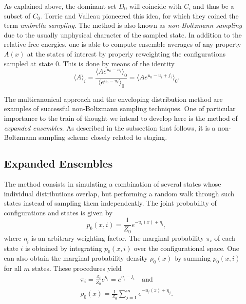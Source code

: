\documentclass[aip,jcp,preprint,amsmath,amssymb]{revtex4-1}
\begin{document}
As explained above, the dominant set $D_0$ will coincide with $C_i$ and thus be a subset of $C_0$. Torrie and Valleau\cite{Torrie_1977} pioneered this idea, for which they coined the term \textit{umbrella sampling}. The method is also known as \textit{non-Boltzmann sampling} due to the usually unphysical character of the sampled state. In addition to the relative free energies, one is able to compute ensemble averages of any property $A(x)$ at the states of interest by properly reweighting the configurations sampled at state $0$. This is done by means of the identity\cite{Torrie_1977}
\begin{equation}
\label{eq:umbrella sampling reweighting}
\langle A \rangle_i = \frac{\langle A e^{u_0 - u_i} \rangle_0}{\langle e^{u_0 - u_i} \rangle_0} = \langle A e^{u_0 - u_i + f_i} \rangle_0.
\end{equation}

The multicanonical approach\cite{Berg_1992, Lee_1993, Abreu_2006} and the enveloping distribution method\cite{Christ_2007, *Christ_2008, *Christ_2009} are examples of successful non-Boltzmann sampling techniques. One of particular importance to the train of thought we intend to develop here is the method of \textit{expanded ensembles}.\cite{Lyubartsev_1992} As described in the subsection that follows, it is a non-Boltzmann sampling scheme closely related to staging.

\subsection{Expanded Ensembles}

The method consists in simulating a combination of several states whose individual distributions overlap, but performing a random walk through such states instead of sampling them independently. The joint probability of configurations and states is given by\cite{Nymeyer_2010}
\begin{equation}
\label{eq:expanded ensemble joint}
p_0(x, i) = \frac{1}{Z_0} e^{-u_i(x) + \eta_i},
\end{equation}
where $\eta_i$ is an arbitrary weighting factor. The marginal probability $\pi_i$ of each state $i$ is obtained by integrating $p_0(x,i)$ over the configurational space. One can also obtain the marginal probability density $\rho_0(x)$ by summing $p_0(x,i)$ for all $m$ states. These procedures yield
\begin{align}
\pi_i = \frac{Z_i}{Z_0} e^{\eta_i} = e^{\eta_i - f_i} \quad \text{and} \label{eq:expanded ensemble prior} \\
\rho_0(x) = \frac{1}{Z_0} \sum_{j=1}^m e^{-u_j(x) + \eta_j}. \label{eq:expanded ensemble evidence}
\end{align}
\end{document}
